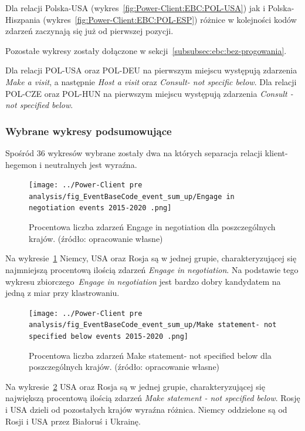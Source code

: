 \documentclass[11pt]{report}
\begin{document}
    Dla relacji Polska-USA (wykres~\ref{fig:Power-Client:EBC:POL-USA}) jak i Polska-Hiszpania (wykres~\ref{fig:Power-Client:EBC:POL-ESP})
    różnice w kolejności kodów zdarzeń zaczynają się już od pierwszej pozycji.

    Pozostałe wykresy zostały dołączone w sekcji~\ref{subsubsec:ebc:bez-progowania}.

    Dla relacji POL-USA oraz POL-DEU na pierwszym miejscu występują zdarzenia \textit{Make a visit}, a następnie
    \textit{Host a visit} oraz \textit{Consult- not specific below}.
    Dla relacji POL-CZE oraz POL-HUN na pierwszym miejscu występują zdarzenia \textit{Consult - not specified below}.

    \subsubsection{Wybrane wykresy podsumowujące}

    Spośród 36 wykresów wybrane zostały dwa na których separacja relacji klient-hegemon i neutralnych jest wyraźna.

    \begin{figure}[!htp]
        \centering
        \texttt{[image: ../Power-Client pre analysis/fig\_EventBaseCode\_event\_sum\_up/Engage in negotiation events 2015-2020 .png]}
        \caption{Procentowa liczba zdarzeń Engage in negotiation dla poszczególnych krajów. (źródło: opracowanie własne)}
        \label{fig:Power-Client:ERC:SumUp:Engage in negotiation}
    \end{figure}
    Na wykresie~\ref{fig:Power-Client:ERC:SumUp:Engage in negotiation} Niemcy, USA oraz Rosja są w jednej grupie,
    charakteryzującej się najmniejszą procentową ilością zdarzeń \textit{Engage in negotiation}.
    Na podstawie tego wykresu zbiorczego~\textit{Engage in negotiation}
    jest bardzo dobry kandydatem na jedną z miar przy klastrowaniu.

    \begin{figure}[!htp]
        \centering
        \texttt{[image: ../Power-Client pre analysis/fig\_EventBaseCode\_event\_sum\_up/Make statement- not specified below events 2015-2020 .png]}
        \caption{Procentowa liczba zdarzeń Make statement- not specified below dla poszczególnych krajów. (źródło: opracowanie własne)}
        \label{fig:Power-Client:ERC:SumUp:Make statement - not specified below}
    \end{figure}
    Na wykresie~\ref{fig:Power-Client:ERC:SumUp:Make statement - not specified below} USA oraz Rosja są w jednej grupie,
    charakteryzującej się największą procentową ilością zdarzeń \textit{Make statement - not specified below}.
    Rosję i USA dzieli od pozostałych krajów wyraźna różnica.
    Niemcy oddzielone są od Rosji i USA przez Białoruś i Ukrainę.
\end{document}
